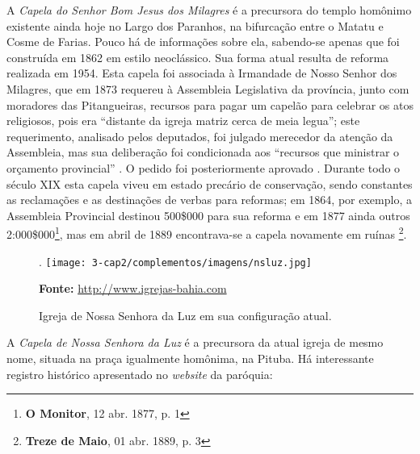 A \textit{Capela do Senhor Bom Jesus dos Milagres} é a precursora do templo homônimo existente ainda hoje no Largo dos Paranhos, na bifurcação entre o Matatu e Cosme de Farias. Pouco há de informações sobre ela, sabendo-se apenas que foi construída em 1862 \cite[p.~251]{VASCONCELOS2002} em estilo neoclássico. Sua forma atual resulta de reforma realizada em 1954. Esta capela foi associada à Irmandade de Nosso Senhor dos Milagres, que em 1873 requereu à Assembleia Legislativa da província, junto com moradores das Pitangueiras, recursos para pagar um capelão para celebrar os atos religiosos, pois era ``distante da igreja matriz cerca de meia legua''; este requerimento, analisado pelos deputados, foi julgado merecedor da atenção da Assembleia, mas sua deliberação foi condicionada aos ``recursos que ministrar o orçamento provincial'' \cite[p.~46]{bahia_relatassleg_1873}. O pedido foi posteriormente aprovado \cite[p.~53]{bahia_relatassleg_1873}. Durante todo o século XIX esta capela viveu em estado precário de conservação, sendo constantes as reclamações e as destinações de verbas para reformas; em 1864, por exemplo, a Assembleia Provincial destinou 500\$000 para sua reforma\cite[anexo~2, p.~2]{silvagomes_relatorio_1864} e em 1877 ainda outros 2:000\$000\footnote{\textbf{O Monitor}, 12 abr. 1877, p. 1}, mas em abril de 1889 encontrava-se a capela novamente em ruínas \footnote{\textbf{Treze de Maio}, 01 abr. 1889, p. 3}. 

\begin{figure}[!htp]
\centering
\caption{Igreja de Nossa Senhora da Luz em sua configuração atual.}.
\texttt{[image: 3-cap2/complementos/imagens/nsluz.jpg]}{\footnotesize \par \textbf{Fonte:} \url{http://www.igrejas-bahia.com} \par}
\end{figure}

A \textit{Capela de Nossa Senhora da Luz} é a precursora da atual igreja de mesmo nome, situada na praça igualmente homônima, na Pituba. Há interessante registro histórico apresentado no \textit{website} da paróquia:

